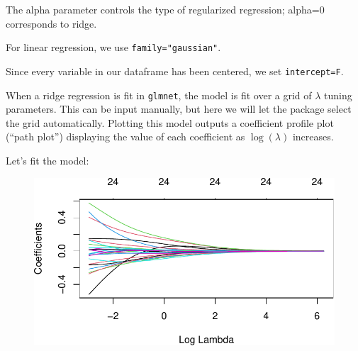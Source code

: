 \documentclass[
  letterpaper,
  DIV=11,
  numbers=noendperiod]{scrreport}
\newenvironment{Shaded}{\begin{snugshade}}{\end{snugshade}}
\newcommand{\AttributeTok}[1]{\textcolor[rgb]{0.40,0.45,0.13}{#1}}
\newcommand{\DecValTok}[1]{\textcolor[rgb]{0.68,0.00,0.00}{#1}}
\newcommand{\FunctionTok}[1]{\textcolor[rgb]{0.28,0.35,0.67}{#1}}
\newcommand{\NormalTok}[1]{\textcolor[rgb]{0.00,0.23,0.31}{#1}}
\newcommand{\OtherTok}[1]{\textcolor[rgb]{0.00,0.23,0.31}{#1}}
\newcommand{\SpecialCharTok}[1]{\textcolor[rgb]{0.37,0.37,0.37}{#1}}
\newcommand{\StringTok}[1]{\textcolor[rgb]{0.13,0.47,0.30}{#1}}
\begin{document}
The alpha parameter controls the type of regularized regression; alpha=0
corresponds to ridge.

For linear regression, we use \texttt{family="gaussian"}.

Since every variable in our dataframe has been centered, we set
\texttt{intercept=F}.

When a ridge regression is fit in \texttt{glmnet}, the model is fit over
a grid of \(\lambda\) tuning parameters. This can be input manually, but
here we will let the package select the grid automatically. Plotting
this model outputs a coefficient profile plot (``path plot'') displaying
the value of each coefficient as \(\log(\lambda)\) increases.

Let's fit the model:

\begin{Shaded}
\end{Shaded}

\begin{figure}[H]

{\centering \includegraphics{week5/week5_files/figure-pdf/unnamed-chunk-12-1.pdf}

}

\end{figure}
\end{document}
